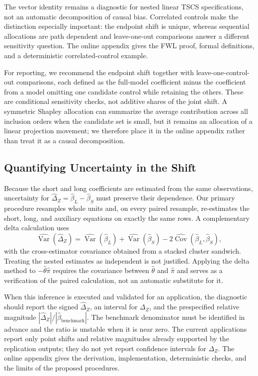 \documentclass[
]{article}
\begin{document}
The vector identity remains a diagnostic for nested linear TSCS
specifications, not an automatic decomposition of causal bias.
Correlated controls make the distinction especially important: the
endpoint shift is unique, whereas sequential allocations are path
dependent and leave-one-out comparisons answer a different sensitivity
question. The online appendix gives the FWL proof, formal definitions,
and a deterministic correlated-control example.

For reporting, we recommend the endpoint shift together with
leave-one-control-out comparisons, each defined as the full-model
coefficient minus the coefficient from a model omitting one candidate
control while retaining the others. These are conditional sensitivity
checks, not additive shares of the joint shift. A symmetric Shapley
allocation can summarize the average contribution across all inclusion
orders when the candidate set is small, but it remains an allocation of
a linear projection movement; we therefore place it in the online
appendix rather than treat it as a causal decomposition.

\subsection{Quantifying Uncertainty in the
Shift}\label{quantifying-uncertainty-in-the-shift}

Because the short and long coefficients are estimated from the same
observations, uncertainty for
\(\widehat\Delta_Z=\widehat\beta_L-\widehat\beta_S\) must preserve their
dependence. Our primary procedure resamples whole units and, on every
paired resample, re-estimates the short, long, and auxiliary equations
on exactly the same rows. A complementary delta calculation uses \[
\widehat{\operatorname{Var}}(\widehat\Delta_Z)
=
\widehat{\operatorname{Var}}(\widehat\beta_L)
+
\widehat{\operatorname{Var}}(\widehat\beta_S)
-
2\widehat{\operatorname{Cov}}(\widehat\beta_L,\widehat\beta_S),
\] with the cross-estimator covariance obtained from a stacked cluster
sandwich. Treating the nested estimates as independent is not justified.
Applying the delta method to \(-\widehat\theta\widehat\pi\) requires the
covariance between \(\widehat\theta\) and \(\widehat\pi\) and serves as
a verification of the paired calculation, not an automatic substitute
for it.

When this inference is executed and validated for an application, the
diagnostic should report the signed \(\widehat\Delta_Z\), an interval
for \(\Delta_Z\), and the prespecified relative magnitude
\(|\widehat\Delta_Z|/|\widehat\beta_{\mathrm{benchmark}}|\). The
benchmark denominator must be identified in advance and the ratio is
unstable when it is near zero. The current applications report only
point shifts and relative magnitudes already supported by the
replication outputs; they do not yet report confidence intervals for
\(\Delta_Z\). The online appendix gives the derivation, implementation,
deterministic checks, and the limits of the proposed procedures.
\end{document}
